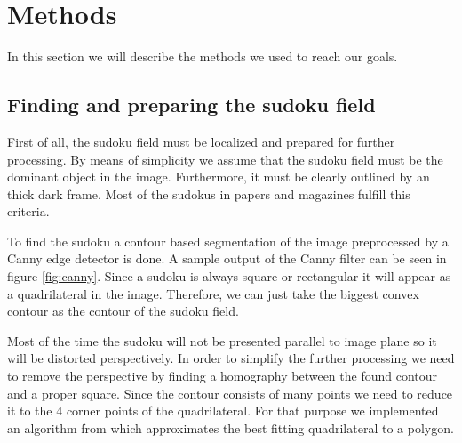 \documentclass[
a4paper,     %
12pt         %
]{scrartcl}  %
\begin{document}



\section{Methods}

In this section we will describe the methods we used to reach our goals.

\subsection{Finding and preparing the sudoku field}
\label{sec:find}

First of all, the sudoku field must be localized and prepared for further
processing. By means of simplicity we assume that the sudoku field must be
the dominant object in the image. Furthermore, it must be clearly outlined by
an thick dark frame. Most of the sudokus in papers and magazines fulfill this
criteria.

To find the sudoku a contour based segmentation of the image preprocessed by
a Canny edge detector is done. A sample output of the Canny filter can be seen
in figure \ref{fig:canny}. Since a sudoku is always square or rectangular
it will appear as a quadrilateral in the image. Therefore, we can just take 
the biggest convex contour as the contour of the sudoku field.

Most of the time the sudoku will not be presented parallel to image plane so
it will be distorted perspectively. In order to simplify the further processing
we need to remove the perspective by finding a homography between the found
contour and a proper square. Since the contour consists of many points we need
to reduce it to the 4 corner points of the quadrilateral. For that purpose we
implemented an algorithm from \cite{quadrilateral_approx} which approximates
the best fitting quadrilateral to a polygon.
\end{document}
